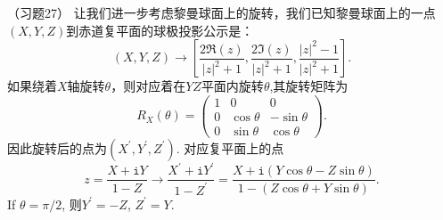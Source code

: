 \documentclass{article}
\begin{document}
（习题27）
让我们进一步考虑黎曼球面上的旋转，我们已知黎曼球面上的一点$(X,Y,Z)$到赤道复平面的球极投影公示是：
\begin{equation*}
    (X, Y, Z)
    \rightarrow\left[\frac{2\Re(z)}{\vert{z}\vert^{2}+1}, \frac{2\Im(z)}{\vert{z}\vert^{2}+1}, \frac{\vert{z}\vert^{2}-1}{\vert{z}\vert^{2}+1}\right].
\end{equation*}
如果绕着$X$轴旋转$\theta$，则对应着在$YZ$平面内旋转$\theta$,其旋转矩阵为
\begin{equation*}
    R_{X}(\theta)
    =\begin{pmatrix}
    1 & 0 & 0 \\
    0 & \cos\theta & -\sin\theta \\
    0 & \sin\theta & \cos\theta
    \end{pmatrix}.
\end{equation*}
因此旋转后的点为$(X^{\prime}, Y^{\prime}, Z^{\prime})$.
对应复平面上的点
\begin{equation*}
z=\frac{X+\mathtt{i}Y}{1-Z}
\rightarrow
\frac{X^{\prime}+\mathtt{i}Y^{\prime}}{1-Z^{\prime}}
=\frac{X+\mathtt{i}\left(Y\cos\theta-Z\sin\theta\right)}{1-\left(Z\cos\theta+Y\sin\theta\right)}.
\end{equation*}
If $\theta=\pi/2$, 则$Y^{\prime}=-Z$, $Z^{\prime}=Y$.


%
%
\end{document}
